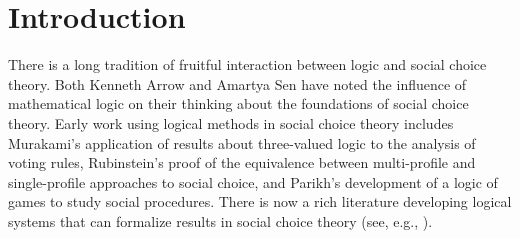 \documentclass[runningheads]{llncs}
\begin{document}
\section{Introduction}

There is a long tradition of fruitful interaction between logic and social choice theory.  Both Kenneth Arrow \cite[p. 154]{Arrow2014}  and Amartya Sen \cite[p. 108]{Sen2017} have noted the influence of mathematical logic on their thinking about the foundations of social choice theory.  Early work using logical methods in social choice theory includes  Murakami's  \cite{Murakami1968}  application of  results about three-valued logic to the analysis of voting rules, Rubinstein's \cite{Rubinstein1984}  proof of the equivalence between multi-profile and single-profile approaches to social choice, and Parikh's \cite{Parikh1985} development of a logic of games to study social procedures.  There is now a rich literature developing logical systems that can formalize results in social choice theory (see, e.g., \cite{Nipkow2009,Tang2011,Endriss2011,GrandiEndriss2013,CinaEndriss2016,HollidayPacuit2020}). 




\end{document}
